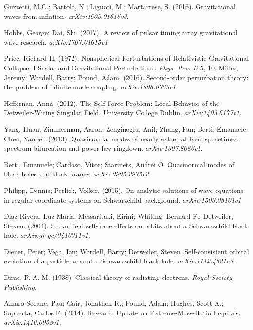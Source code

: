 Guzzetti, M.C.; Bartolo, N.; Liguori, M.; Martarrese, S. (2016). Gravitational waves from inflation. {\em arXiv:1605.01615v3}.

Hobbs, George; Dai, Shi. (2017). A review of pulsar timing array gravitational wave research. {\em arXiv:1707.01615v1}

Price, Richard H. (1972). Nonspherical Perturbations of Relativistic Gravitational Collapse. I Scalar and Gravitational Perturbations. {\em Phys. Rev. D} 5, 10. 
Miller, Jeremy; Wardell, Barry; Pound, Adam. (2016). Second-order perturbation theory: the problem of infinite mode coupling. {\em arXiv:1608.0783v1}.

Heffernan, Anna. (2012). The Self-Force Problem: Local Behavior of the Detweiler-Witing Singular Field. University College Dublin. {\em arXiv:1403.6177v1}.

Yang, Huan; Zimmerman, Aaron; Zenginoglu, Anil; Zhang, Fan; Berti, Emanuele; Chen, Yanbei. (2013). Quasinormal modes of nearly extremal Kerr spacetimes: spectrum bifurcation and power-law ringdown. {\em arXiv:1307.8086v1}.

Berti, Emanuele; Cardoso, Vitor; Starinets, Andrei O. Quasinormal modes of black holes and black branes. {\em arXiv:0905.2975v2}

Philipp, Dennis; Perlick, Volker. (2015). On analytic solutions of wave equations in regular coordinate systems on Schwarzchild background. {\em arXiv:1503.08101v1} 

Diaz-Rivera, Luz Maria; Messaritaki, Eirini; Whiting, Bernard F.; Detweiler, Steven. (2004). Scalar field self-force effects on orbits about a Schwarzschild black hole. {\em arXiv:gr-qc/0410011v1}.

Diener, Peter; Vega, Ian; Wardell, Barry; Detweiler, Steven. Self-consistent orbital evolution of a particle around a Schwarzschild black hole. {\em arXiv:1112.4821v3}.

Dirac, P. A. M. (1938). Classical theory of radiating electrons. {\em Royal Society Publishing.}

Amaro-Seoane, Pau; Gair, Jonathon R.; Pound, Adam; Hughes, Scott A.; Sopuerta, Carlos F. (2014). Research Update on Extreme-Mass-Ratio Inspirals. {\em arXiv:1410.0958v1}.

